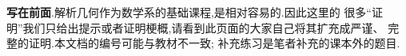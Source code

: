 
\textbf{写在前面}.解析几何作为数学系的基础课程,是相对容易的.因此这里的
很多“证明”我们只给出提示或者证明梗概,请看到此页面的大家自己将其扩充成严谨、
完整的证明.本文档的编号可能与教材不一致; 补充练习是笔者补充的课本外的题目.


\begin{structure}
\end{structure}